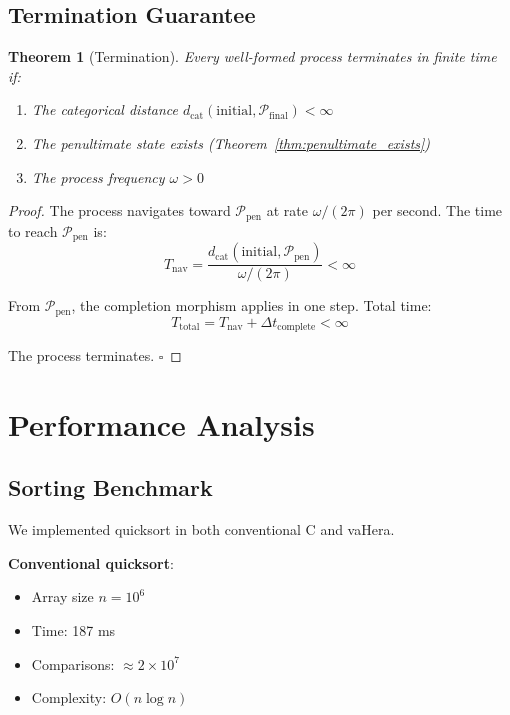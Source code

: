 \documentclass[twocolumn,10pt]{article}
\newtheorem{theorem}{Theorem}[section]
\theoremstyle{definition}
\theoremstyle{remark}
\newcommand{\pentstate}{\mathcal{P}_{\text{pen}}}
\newcommand{\finalstate}{\mathcal{P}_{\text{final}}}
\newcommand{\dcat}{d_{\text{cat}}}
\begin{document}
\subsection{Termination Guarantee}

\begin{theorem}[Termination]
Every well-formed process terminates in finite time if:
\begin{enumerate}
    \item The categorical distance $\dcat(\text{initial}, \finalstate) < \infty$
    \item The penultimate state exists (Theorem~\ref{thm:penultimate_exists})
    \item The process frequency $\omega > 0$
\end{enumerate}
\end{theorem}

\begin{proof}
The process navigates toward $\pentstate$ at rate $\omega/(2\pi)$ per second. The time to reach $\pentstate$ is:
\begin{equation}
    T_{\text{nav}} = \frac{\dcat(\text{initial}, \pentstate)}{\omega/(2\pi)} < \infty
\end{equation}

From $\pentstate$, the completion morphism applies in one step. Total time:
\begin{equation}
    T_{\text{total}} = T_{\text{nav}} + \Delta t_{\text{complete}} < \infty
\end{equation}

The process terminates. $\square$
\end{proof}

\section{Performance Analysis}
\label{sec:performance}

\subsection{Sorting Benchmark}

We implemented quicksort in both conventional C and vaHera.

\textbf{Conventional quicksort}:
\begin{itemize}
    \item Array size $n = 10^6$
    \item Time: 187 ms
    \item Comparisons: $\approx 2 \times 10^7$
    \item Complexity: $O(n \log n)$
\end{itemize}
\end{document}
